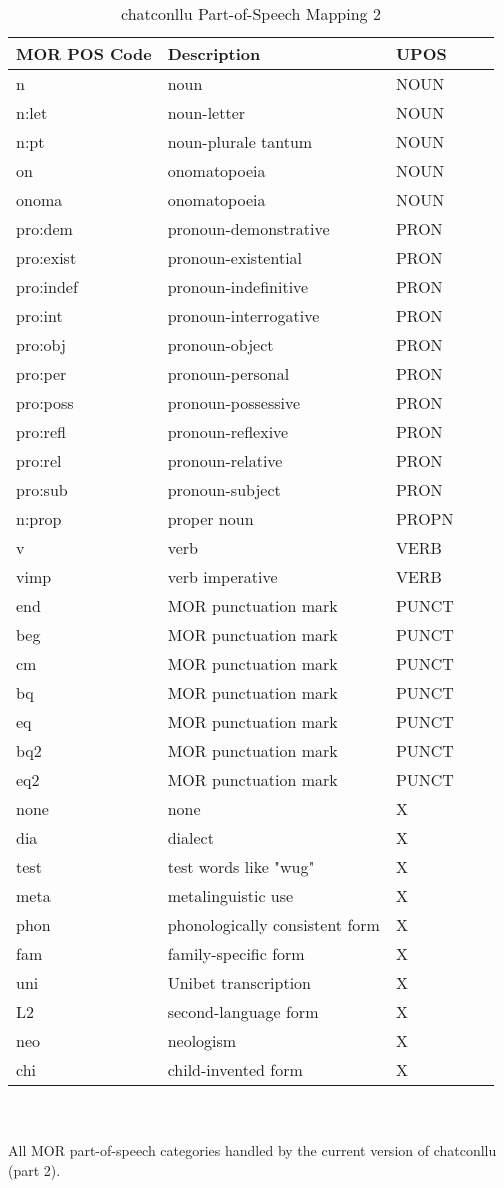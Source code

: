 \newpage
\vspace{-2cm}
\begin{table}[h!]
\caption {chatconllu Part-of-Speech Mapping 2} \label{tab:posmap2}
\begin{tabular}{@{}lllll@{}}
\toprule
\textbf{MOR POS Code} & \textbf{Description} & \textbf{UPOS}\\ \midrule
n & noun & NOUN\\
n:let & noun-letter & NOUN\\
n:pt & noun-plurale tantum & NOUN\\
on & onomatopoeia & NOUN\\
onoma & onomatopoeia & NOUN\\\midrule
pro:dem & pronoun-demonstrative & PRON\\
pro:exist & pronoun-existential & PRON\\
pro:indef & pronoun-indefinitive & PRON\\
pro:int & pronoun-interrogative & PRON\\
pro:obj & pronoun-object & PRON\\
pro:per & pronoun-personal & PRON\\
pro:poss & pronoun-possessive & PRON\\
pro:refl & pronoun-reflexive & PRON\\
pro:rel & pronoun-relative & PRON\\
pro:sub & pronoun-subject & PRON\\
n:prop & proper noun & PROPN\\\midrule
v & verb & VERB\\
vimp & verb imperative & VERB\\\midrule
end & MOR punctuation mark & PUNCT\\
beg & MOR punctuation mark & PUNCT\\
cm & MOR punctuation mark & PUNCT\\
bq & MOR punctuation mark & PUNCT\\
eq & MOR punctuation mark & PUNCT\\
bq2 & MOR punctuation mark & PUNCT\\
eq2 & MOR punctuation mark & PUNCT\\\midrule
none & none & X\\
dia & dialect & X\\
test & test words like "wug" & X\\
meta & metalinguistic use & X\\
phon & phonologically consistent form & X\\
fam & family-specific form & X\\
uni & Unibet transcription & X\\
L2 & second-language form & X\\
neo & neologism & X\\
chi & child-invented form & X\\\bottomrule
\end{tabular}\\
\vspace{0.5cm}
\\
All MOR part-of-speech categories handled by the current version of chatconllu (part 2).\\
\end{table}

